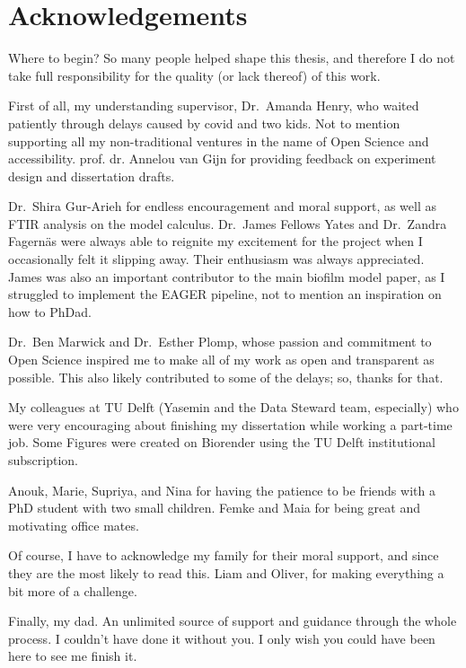\documentclass[
  b5paper,
]{book}
\begin{document}

\hypertarget{acknowledgements}{%
\chapter*{Acknowledgements}\label{acknowledgements}}


Where to begin? So many people helped shape this thesis, and therefore I
do not take full responsibility for the quality (or lack thereof) of
this work.

First of all, my understanding supervisor, Dr.~Amanda Henry, who waited
patiently through delays caused by covid and two kids. Not to mention
supporting all my non-traditional ventures in the name of Open Science
and accessibility. prof. dr. Annelou van Gijn for providing feedback on
experiment design and dissertation drafts.

Dr.~Shira Gur-Arieh for endless encouragement and moral support, as well
as FTIR analysis on the model calculus. Dr.~James Fellows Yates and
Dr.~Zandra Fagernäs were always able to reignite my excitement for the
project when I occasionally felt it slipping away. Their enthusiasm was
always appreciated. James was also an important contributor to the main
biofilm model paper, as I struggled to implement the EAGER pipeline, not
to mention an inspiration on how to PhDad.

Dr.~Ben Marwick and Dr.~Esther Plomp, whose passion and commitment to
Open Science inspired me to make all of my work as open and transparent
as possible. This also likely contributed to some of the delays; so,
thanks for that.

My colleagues at TU Delft (Yasemin and the Data Steward team,
especially) who were very encouraging about finishing my dissertation
while working a part-time job. Some Figures were created on Biorender
using the TU Delft institutional subscription.

Anouk, Marie, Supriya, and Nina for having the patience to be friends
with a PhD student with two small children. Femke and Maia for being
great and motivating office mates.

Of course, I have to acknowledge my family for their moral support, and
since they are the most likely to read this. Liam and Oliver, for making
everything a bit more of a challenge.

Finally, my dad. An unlimited source of support and guidance through the
whole process. I couldn't have done it without you. I only wish you
could have been here to see me finish it.
\end{document}
